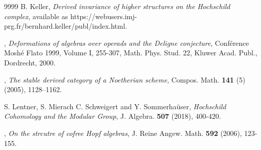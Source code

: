 \documentclass[a4paper, 11pt]{amsart}
\theoremstyle{definition}
\theoremstyle{remark}
\numberwithin{equation}{section}
\begin{document}
\begin{thebibliography}{9999}
 {\sc B. Keller}, {\em Derived invariance of higher structures on the Hochschild complex}, available as 
https://webusers.imj-prg.fr/bernhard.keller/publ/index.html.





, {\em Deformations of algebras over operads and the Deligne conjecture}, Conf\'erence Mosh\'e Flato 1999, Volume I, 255-307, Math. Phys. Stud. 22, Kluwer Acad. Publ., Dordrecht, 2000. 

, {\em The stable derived category of a Noetherian scheme}, Compos. Math. {\bf 141} (5) (2005), 1128--1162.









 {\sc S. Lentner, S. Mierach C. Schweigert and Y. Sommerha\"{u}ser}, {\em Hochschild Cohomology and the Modular Group}, J. Algebra. {\bf 507} (2018), 400-420.

, {\em On the strcutre of cofree Hopf algebras}, J. Reine Angew. Math. {\bf 592} (2006), 123-155.




\end{thebibliography}
\end{document}
